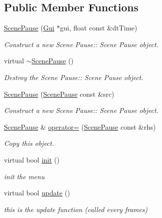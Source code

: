 \subsection*{Public Member Functions}
\begin{DoxyCompactItemize}
\item 
\hyperlink{class_scene_pause_adc7025caea876459a8429ffffd02f8b7}{Scene\+Pause} (\hyperlink{class_gui}{Gui} $\ast$gui, float const \&dt\+Time)
\begin{DoxyCompactList}\small\item\em Construct a new Scene Pause\+:\+: Scene Pause object. \end{DoxyCompactList}\item 
\mbox{\label{class_scene_pause_a73d92c3b2bdf77f5e35f2bf7443dadf8}} 
virtual \hyperlink{class_scene_pause_a73d92c3b2bdf77f5e35f2bf7443dadf8}{$\sim$\+Scene\+Pause} ()
\begin{DoxyCompactList}\small\item\em Destroy the Scene Pause\+:\+: Scene Pause object. \end{DoxyCompactList}\item 
\hyperlink{class_scene_pause_ab29265b4f3e3c8cfd7fd2e0ba116daab}{Scene\+Pause} (\hyperlink{class_scene_pause}{Scene\+Pause} const \&src)
\begin{DoxyCompactList}\small\item\em Construct a new Scene Pause\+:\+: Scene Pause object. \end{DoxyCompactList}\item 
\hyperlink{class_scene_pause}{Scene\+Pause} \& \hyperlink{class_scene_pause_a27c0ac4756961e331d996ba0d2ffe269}{operator=} (\hyperlink{class_scene_pause}{Scene\+Pause} const \&rhs)
\begin{DoxyCompactList}\small\item\em Copy this object. \end{DoxyCompactList}\item 
virtual bool \hyperlink{class_scene_pause_ae5e00c5fcd82e97985d93f918b9e4b35}{init} ()
\begin{DoxyCompactList}\small\item\em init the menu \end{DoxyCompactList}\item 
virtual bool \hyperlink{class_scene_pause_a376de6952be83718fb19d268d9327ef6}{update} ()
\begin{DoxyCompactList}\small\item\em this is the update function (called every frames) \end{DoxyCompactList}\item 

\end{DoxyCompactItemize}
